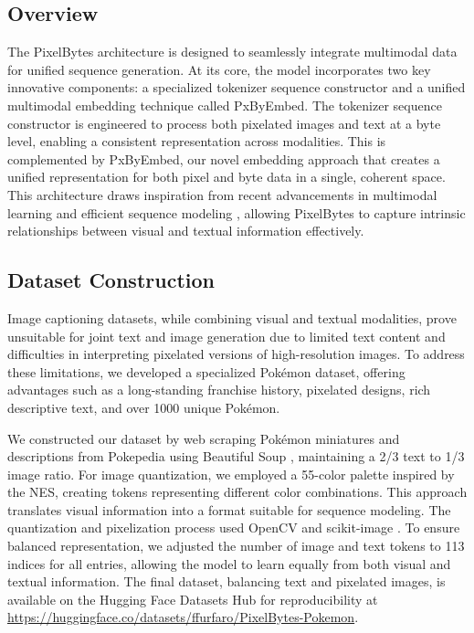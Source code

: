 \documentclass[10pt,a4paper]{article}
\begin{document}
\subsection{Overview}
The PixelBytes architecture is designed to seamlessly integrate multimodal data for unified sequence generation. At its core, the model incorporates two key innovative components: a specialized tokenizer sequence constructor and a unified multimodal embedding technique called PxByEmbed. The tokenizer sequence constructor is engineered to process both pixelated images and text at a byte level, enabling a consistent representation across modalities. This is complemented by PxByEmbed, our novel embedding approach that creates a unified representation for both pixel and byte data in a single, coherent space. This architecture draws inspiration from recent advancements in multimodal learning \cite{baltruvsaitis2018multimodal} and efficient sequence modeling \cite{vaswani2017attention}, allowing PixelBytes to capture intrinsic relationships between visual and textual information effectively.

\subsection{Dataset Construction}

Image captioning datasets, while combining visual and textual modalities, prove unsuitable for joint text and image generation due to limited text content and difficulties in interpreting pixelated versions of high-resolution images. To address these limitations, we developed a specialized Pokémon dataset, offering advantages such as a long-standing franchise history, pixelated designs, rich descriptive text, and over 1000 unique Pokémon. 

We constructed our dataset by web scraping Pokémon miniatures and descriptions from Pokepedia using Beautiful Soup \cite{richardson2007beautiful}, maintaining a 2/3 text to 1/3 image ratio. For image quantization, we employed a 55-color palette inspired by the NES, creating tokens representing different color combinations. This approach translates visual information into a format suitable for sequence modeling. The quantization and pixelization process used OpenCV and scikit-image \cite{bradski2000opencv, van2014scikit}. To ensure balanced representation, we adjusted the number of image and text tokens to 113 indices for all entries, allowing the model to learn equally from both visual and textual information. The final dataset, balancing text and pixelated images, is available on the Hugging Face Datasets Hub for reproducibility at \url{https://huggingface.co/datasets/ffurfaro/PixelBytes-Pokemon}.
\end{document}
